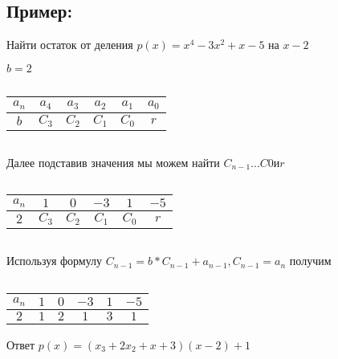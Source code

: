 \documentclass[12pt]{article}
\begin{document}
\subsection{Пример:}
Найти остаток от деления $p(x) = x^{4} - 3x^{2} + x -5$ на $x-2$\par
$b=2$\par
$ $\par
\begin{tabular}{ |c|c|c|c|c|c| } 
 \hline
 $a_{n}$ & $a_{4}$ & $a_{3}$ & $a_{2}$ & $a_{1}$ & $a_{0}$\\
 \hline
 \hline
  $b$ & $C_{3}$ & $C_{2}$ & $C_{1}$ & $C_{0}$ & $r$\\
 \hline
\end{tabular}\par
$ $\par
Далее подставив значения мы можем найти $C_{n-1} ... C{0} и r$\par
$ $\par
\begin{tabular}{ |c|c|c|c|c|c| } 
 \hline
    $a_{n}$ & $1$ & $0$ & $-3$ & $1$ & $-5$\\
 \hline
  \hline
     $2$ & $C_{3}$ & $C_{2}$ & $C_{1}$ & $C_{0}$ & $r$\\
 \hline
\end{tabular}\par
$ $\par
Используя формулу $C_{n-1} = b*C_{n-1}+a_{n-1},C_{n-1}=a_{n}$ получим\par
$ $\par
\begin{tabular}{ |c|c|c|c|c|c| } 
 \hline
    $a_{n}$ & $1$ & $0$ & $-3$ & $1$ & $-5$\\
 \hline
  \hline
     $2$ & $1$ & $2$ & $1$ & $3$ & $1$\\
 \hline
\end{tabular}\par
Ответ $p(x) =(x_{3} + 2x_{2} + x +3)(x-2) + 1$
\end{document}
